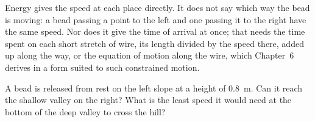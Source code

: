 Energy gives the speed at each place directly. It does not say which way
the bead is moving: a bead passing a point to the left and one passing it
to the right have the same speed. Nor does it give the time of arrival at
once; that needs the time spent on each short stretch of wire, its length
divided by the speed there, added up along the way, or the equation of
motion along the wire, which Chapter~6 derives in a form suited to such
constrained motion.


\begin{selfcheck}
A bead is released from rest on the left slope at a height of
\SI{0.8}{\metre}. Can it reach the shallow valley on the right? What is
the least speed it would need at the bottom of the deep valley to cross
the hill?
\end{selfcheck}
